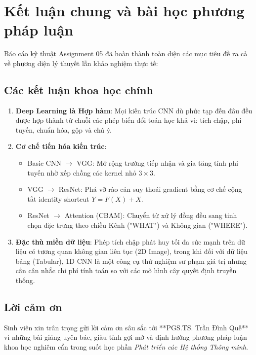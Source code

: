 \documentclass[12pt,a4paper]{article}
\begin{document}
\newpage

\section{Kết luận chung và bài học phương pháp luận}\label{sec:conclusion}

Báo cáo kỹ thuật Assignment 05 đã hoàn thành toàn diện các mục tiêu đề ra cả về phương diện lý thuyết lẫn khảo nghiệm thực tế:

\subsection{Các kết luận khoa học chính}
\begin{enumerate}[leftmargin=*]
    \item \textbf{Deep Learning là Hợp hàm}: Mọi kiến trúc CNN dù phức tạp đến đâu đều được hợp thành từ chuỗi các phép biến đổi toán học khả vi: tích chập, phi tuyến, chuẩn hóa, gộp và chú ý.
    \item \textbf{Cơ chế tiến hóa kiến trúc}:
    \begin{itemize}
        \item Basic CNN $\to$ VGG: Mở rộng trường tiếp nhận và gia tăng tính phi tuyến nhờ xếp chồng các kernel nhỏ $3 \times 3$.
        \item VGG $\to$ ResNet: Phá vỡ rào cản suy thoái gradient bằng cơ chế cộng tắt identity shortcut $Y = F(X) + X$.
        \item ResNet $\to$ Attention (CBAM): Chuyển từ xử lý đồng đều sang tinh chọn đặc trưng theo chiều Kênh ("WHAT") và Không gian ("WHERE").
    \end{itemize}
    \item \textbf{Đặc thù miền dữ liệu}: Phép tích chập phát huy tối đa sức mạnh trên dữ liệu có tương quan không gian liên tục (2D Image), trong khi đối với dữ liệu bảng (Tabular), 1D CNN là một công cụ thử nghiệm sư phạm giá trị nhưng cần cân nhắc chi phí tính toán so với các mô hình cây quyết định truyền thống.
\end{enumerate}

\subsection{Lời cảm ơn}
Sinh viên xin trân trọng gửi lời cảm ơn sâu sắc tới **PGS.TS. Trần Đình Quế** vì những bài giảng uyên bác, giàu tính gợi mở và định hướng phương pháp luận khoa học nghiêm cẩn trong suốt học phần \textit{Phát triển các Hệ thống Thông minh}.
\end{document}
